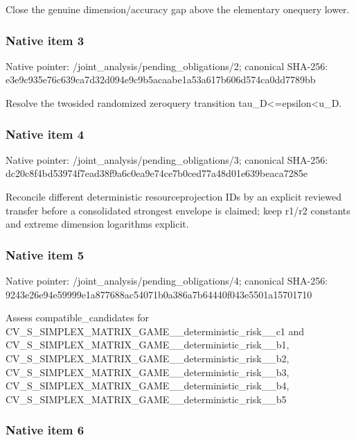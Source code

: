 \documentclass[10pt,a4paper]{article}
\begin{document}
Close the genuine dimension/accuracy gap above the elementary onequery lower.


\subsubsection{Native item 3}


Native pointer: /joint\_analysis/pending\_obligations/2; canonical SHA-256: e3e9c935e76c639ca7d32d09\allowbreak{}4e9c9b5acaabe1a53a617b60\allowbreak{}6d574ca0dd7789bb


Resolve the twosided randomized zeroquery transition tau\_D<=epsilon<u\_D.


\subsubsection{Native item 4}


Native pointer: /joint\_analysis/pending\_obligations/3; canonical SHA-256: dc20c8f4bd53974f7ead38f9\allowbreak{}a6c0ea9e74ce7b0ced77a48d\allowbreak{}01e639beaca7285e


Reconcile different deterministic resourceprojection IDs by an explicit reviewed transfer before a consolidated strongest envelope is claimed; keep r1/r2 constants and extreme dimension logarithms explicit.


\subsubsection{Native item 5}


Native pointer: /joint\_analysis/pending\_obligations/4; canonical SHA-256: 9243e26e94e59999e1a87768\allowbreak{}8ac54071b0a386a7b64440f0\allowbreak{}43e5501a15701710


Assess compatible\_candidates for CV\_S\_SIMPLEX\_MATRIX\_GAME\allowbreak{}\_\_deterministic\_risk\_\_c1 and CV\_S\_SIMPLEX\_MATRIX\_GAME\allowbreak{}\_\_deterministic\_risk\_\_b1\allowbreak{}, CV\_S\_SIMPLEX\_MATRIX\_GAME\allowbreak{}\_\_deterministic\_risk\_\_b2\allowbreak{}, CV\_S\_SIMPLEX\_MATRIX\_GAME\allowbreak{}\_\_deterministic\_risk\_\_b3\allowbreak{}, CV\_S\_SIMPLEX\_MATRIX\_GAME\allowbreak{}\_\_deterministic\_risk\_\_b4\allowbreak{}, CV\_S\_SIMPLEX\_MATRIX\_GAME\allowbreak{}\_\_deterministic\_risk\_\_b5


\subsubsection{Native item 6}
\end{document}

